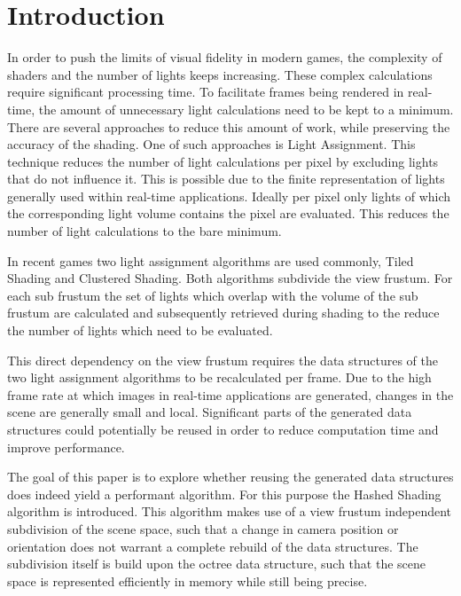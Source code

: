 \section{Introduction}

In order to push the limits of visual fidelity in modern games, the complexity
of shaders and the number of lights keeps increasing. These complex calculations
require significant processing time. To facilitate frames being rendered in
real-time, the amount of unnecessary light calculations need to be kept to a
minimum. There are several approaches to reduce this amount of work, while
preserving the accuracy of the shading. One of such approaches is Light
Assignment. This technique reduces the number of light calculations per pixel by
excluding lights that do not influence it. This is possible due to the finite
representation of lights generally used within real-time applications. Ideally
per pixel only lights of which the corresponding light volume contains the pixel
are evaluated. This reduces the number of light calculations to the bare minimum.

In recent games two light assignment algorithms are used commonly, Tiled
Shading\cite{olsson2011tiled} and Clustered Shading\cite{olsson2012clustered}.
Both algorithms subdivide the view frustum. For each sub frustum the set of
lights which overlap with the volume of the sub frustum are calculated and
subsequently retrieved during shading to the reduce the number of lights which
need to be evaluated.

This direct dependency on the view frustum requires the data structures of the
two light assignment algorithms to be recalculated per frame. Due to the high
frame rate at which images in real-time applications are generated, changes in
the scene are generally small and local. Significant parts of the generated data
structures could potentially be reused in order to reduce computation time and
improve performance.

The goal of this paper is to explore whether reusing the generated data
structures does indeed yield a performant algorithm. For this purpose the Hashed
Shading algorithm is introduced. This algorithm makes use of a view frustum
independent subdivision of the scene space, such that a change in camera
position or orientation does not warrant a complete rebuild of the data
structures. The subdivision itself is build upon the octree data structure, such
that the scene space is represented efficiently in memory while still being precise.  

